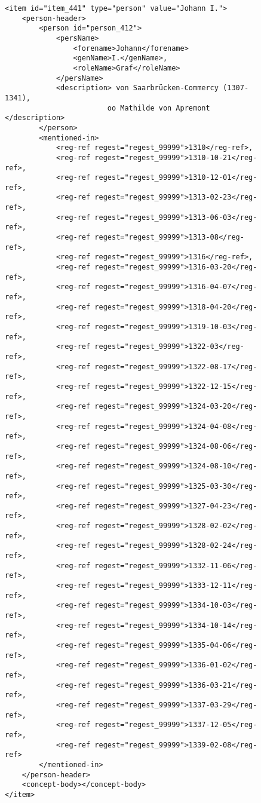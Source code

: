 \begin{figure}
\begin{verbatim}
<item id="item_441" type="person" value="Johann I.">
    <person-header>
        <person id="person_412">
            <persName>
                <forename>Johann</forename> 
                <genName>I.</genName>, 
                <roleName>Graf</roleName>
            </persName>
            <description> von Saarbrücken-Commercy (1307-1341), 
                        oo Mathilde von Apremont </description>
        </person>
        <mentioned-in>
            <reg-ref regest="regest_99999">1310</reg-ref>, 
            <reg-ref regest="regest_99999">1310-10-21</reg-ref>, 
            <reg-ref regest="regest_99999">1310-12-01</reg-ref>, 
            <reg-ref regest="regest_99999">1313-02-23</reg-ref>, 
            <reg-ref regest="regest_99999">1313-06-03</reg-ref>, 
            <reg-ref regest="regest_99999">1313-08</reg-ref>, 
            <reg-ref regest="regest_99999">1316</reg-ref>, 
            <reg-ref regest="regest_99999">1316-03-20</reg-ref>, 
            <reg-ref regest="regest_99999">1316-04-07</reg-ref>, 
            <reg-ref regest="regest_99999">1318-04-20</reg-ref>, 
            <reg-ref regest="regest_99999">1319-10-03</reg-ref>, 
            <reg-ref regest="regest_99999">1322-03</reg-ref>, 
            <reg-ref regest="regest_99999">1322-08-17</reg-ref>, 
            <reg-ref regest="regest_99999">1322-12-15</reg-ref>, 
            <reg-ref regest="regest_99999">1324-03-20</reg-ref>, 
            <reg-ref regest="regest_99999">1324-04-08</reg-ref>, 
            <reg-ref regest="regest_99999">1324-08-06</reg-ref>, 
            <reg-ref regest="regest_99999">1324-08-10</reg-ref>, 
            <reg-ref regest="regest_99999">1325-03-30</reg-ref>, 
            <reg-ref regest="regest_99999">1327-04-23</reg-ref>, 
            <reg-ref regest="regest_99999">1328-02-02</reg-ref>, 
            <reg-ref regest="regest_99999">1328-02-24</reg-ref>, 
            <reg-ref regest="regest_99999">1332-11-06</reg-ref>, 
            <reg-ref regest="regest_99999">1333-12-11</reg-ref>, 
            <reg-ref regest="regest_99999">1334-10-03</reg-ref>, 
            <reg-ref regest="regest_99999">1334-10-14</reg-ref>, 
            <reg-ref regest="regest_99999">1335-04-06</reg-ref>, 
            <reg-ref regest="regest_99999">1336-01-02</reg-ref>, 
            <reg-ref regest="regest_99999">1336-03-21</reg-ref>, 
            <reg-ref regest="regest_99999">1337-03-29</reg-ref>, 
            <reg-ref regest="regest_99999">1337-12-05</reg-ref>, 
            <reg-ref regest="regest_99999">1339-02-08</reg-ref>
        </mentioned-in>
    </person-header>
    <concept-body></concept-body>
</item>
\end{verbatim}
\end{figure}

